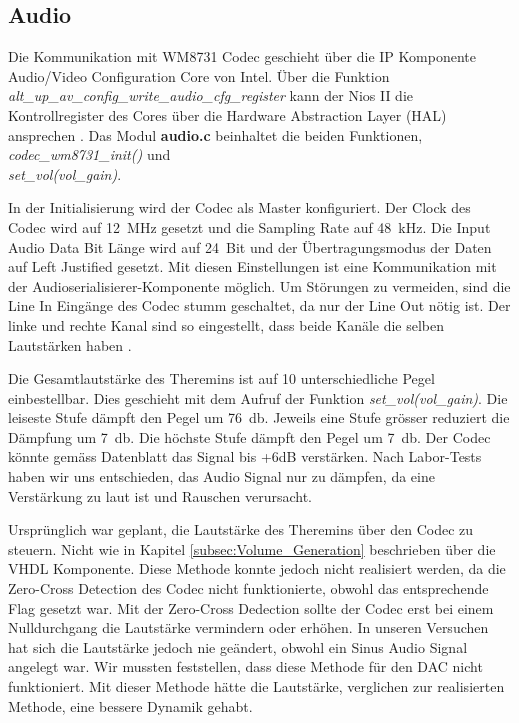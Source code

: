 \subsection{Audio}\label{subsec:audio}

Die Kommunikation mit WM8731 Codec geschieht über die IP Komponente Audio/Video Configuration Core von Intel. Über die Funktion 
\textit{alt\_up\_av\_config\_write\_audio\_cfg\_register} kann der Nios II die Kontrollregister des Cores über die Hardware Abstraction Layer (HAL) ansprechen \cite{Audio_config}.
Das Modul \textbf{audio.c} beinhaltet die beiden Funktionen, \textit{codec\_wm8731\_init()} und\\ \textit{set\_vol(vol\_gain)}. 

In der Initialisierung wird der Codec als Master konfiguriert. Der Clock des Codec wird auf \SI{12}{MHz} gesetzt und die Sampling Rate auf \SI{48}{kHz}. Die Input Audio Data Bit Länge wird auf \SI{24}{Bit} und der Übertragungsmodus der Daten auf Left Justified gesetzt. Mit diesen Einstellungen ist eine Kommunikation mit der Audioserialisierer-Komponente möglich.
Um Störungen zu vermeiden, sind die Line In Eingänge des Codec stumm geschaltet, da nur der Line Out nötig ist. Der linke und rechte Kanal sind so eingestellt, dass beide Kanäle die selben Lautstärken haben \cite{codec}. 

Die Gesamtlautstärke des Theremins ist auf 10 unterschiedliche Pegel einbestellbar. Dies geschieht mit dem Aufruf der Funktion \textit{set\_vol(vol\_gain)}. Die leiseste Stufe dämpft den Pegel um \SI{76}{db}. Jeweils eine Stufe grösser reduziert die Dämpfung um \SI{7}{db}. Die höchste Stufe dämpft den Pegel um \SI{7}{db}. Der Codec könnte gemäss Datenblatt das Signal bis +6dB verstärken. Nach Labor-Tests haben wir uns entschieden, das Audio Signal nur zu dämpfen, da eine Verstärkung zu laut ist und Rauschen verursacht.

Ursprünglich war geplant, die Lautstärke des Theremins über den Codec zu steuern. Nicht wie in Kapitel \ref{subsec:Volume_Generation} beschrieben über die VHDL Komponente. Diese Methode konnte jedoch nicht realisiert werden, da die Zero-Cross Detection des Codec nicht funktionierte, obwohl das entsprechende Flag gesetzt war. Mit der Zero-Cross Dedection sollte der Codec erst bei einem Nulldurchgang die Lautstärke vermindern oder erhöhen. In unseren Versuchen hat sich die Lautstärke jedoch nie geändert, obwohl ein Sinus Audio Signal angelegt war. Wir mussten feststellen, dass diese Methode für den DAC nicht funktioniert. Mit dieser Methode hätte die Lautstärke, verglichen zur realisierten Methode, eine bessere Dynamik gehabt. 